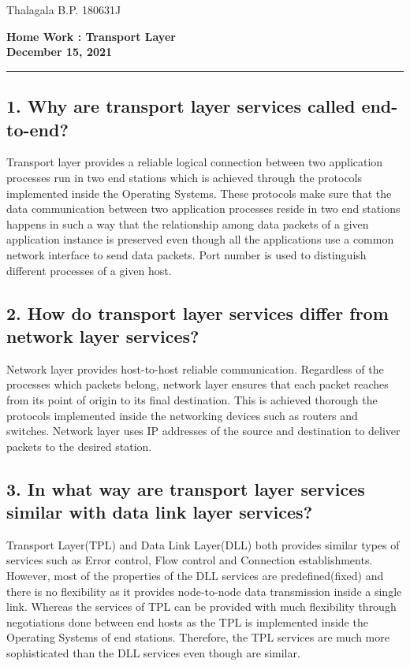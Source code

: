 \documentclass[a4paper,11pt]{article}
\begin{document}
	Thalagala B.P. 180631J
\begin{center}
{	\Large\textbf{Home Work : Transport Layer}}\\[2mm]

\textbf{December 15, 2021}
\end{center}
\vspace{5mm}
\hrule
\vspace{5mm}
\subsection*{1. Why are transport layer services called end-to-end?}

Transport layer provides a reliable logical connection between two application processes run in two end stations which is achieved through the  protocols implemented inside the Operating Systems. These protocols make sure that the data communication between two application processes reside in two end stations happens in such a way that the relationship among data packets of a given application instance is preserved even though all the applications use a common network interface to send data packets. Port number is used to distinguish different processes of a given host.

\subsection*{2. How do transport layer services differ from network layer services?}

Network layer provides host-to-host reliable communication. Regardless of the processes which packets belong, network layer ensures that each packet reaches from its point of origin to its final destination. This is achieved thorough the protocols implemented inside the networking devices such as routers and switches. Network layer uses IP addresses of the source and destination to deliver packets to the desired station.

\subsection*{3. In what way are transport layer services similar with data link layer services?}

Transport Layer(TPL) and Data Link Layer(DLL) both provides similar types of services such as Error control, Flow control and Connection establishments. However, most of the properties of the DLL services are predefined(fixed) and there is no flexibility as it provides node-to-node data transmission inside a single link. Whereas the services of TPL can be  provided with much flexibility through negotiations done between end hosts as the TPL is implemented inside the Operating Systems of end stations. Therefore, the TPL services are much more sophisticated than the DLL services even though are similar.
\end{document}
